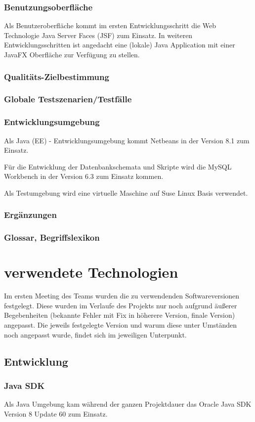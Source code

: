 \documentclass[12pt,a4paper,parskip]{scrreprt}
\begin{document}
\subsection{Benutzungsoberfläche}
Als Benutzeroberfläche kommt im ersten Entwicklungsschritt die Web Technologie Java Server Faces (JSF) zum Einsatz. In weiteren Entwicklungsschritten ist angedacht eine (lokale) Java Application mit einer JavaFX Oberfläche zur Verfügung zu stellen.
\subsection{Qualitäts-Zielbestimmung}
\subsection{Globale Testszenarien/Testfälle}
\subsection{Entwicklungsumgebung}
Als Java (EE) - Entwicklungsumgebung kommt Netbeans in der Version 8.1 zum Einsatz.

Für die Entwicklung der Datenbankschemata und Skripte wird die MySQL Workbench in der Version 6.3 zum Einsatz kommen.

Als Testumgebung wird eine virtuelle Maschine auf Suse Linux Basis verwendet. 
\subsection{Ergänzungen}
\subsection{Glossar, Begriffslexikon}
\chapter{verwendete Technologien}
Im ersten Meeting des Teams wurden die zu verwendenden Softwareversionen festgelegt. Diese wurden im Verlaufe des Projekts nur noch aufgrund äußerer Begebenheiten (bekannte Fehler mit Fix in höherere Version, finale Version) angepasst. Die jeweils festgelegte Version und warum diese unter Umständen noch angepasst wurde, findet sich im jeweiligen Unterpunkt.
\section{Entwicklung}
\subsection{Java SDK}
Als Java Umgebung kam während der ganzen Projektdauer das Oracle Java SDK Version 8 Update 60 zum Einsatz.
\end{document}
